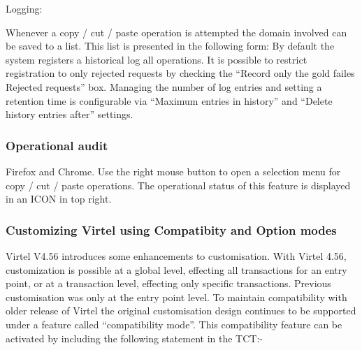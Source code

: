 \documentclass[letterpaper,10pt,english]{sphinxmanual}
\begin{document}
Logging:

Whenever a copy / cut / paste operation is attempted the domain involved can be saved to a list. This list is presented in the following form:
By default the system registers a historical log all operations. It is possible to restrict registration to only rejected
requests by checking the “Record only the gold failes Rejected requests” box. Managing the number of log entries
and setting a retention time is configurable via “Maximum entries in history” and “Delete history entries after”
settings.


\subsubsection{Operational audit}
\label{\detokenize{User_Guide:operational-audit}}
Firefox and Chrome. Use the right mouse button to open a selection menu for copy / cut / paste operations. The
operational status of this feature is displayed in an ICON in top right.








\subsubsection{Customizing Virtel using Compatibity and Option modes}
\label{\detokenize{User_Guide:customizing-virtel-using-compatibity-and-option-modes}}\label{\detokenize{User_Guide:v457ug-customizing-with-option}}
Virtel V4.56 introduces some enhancements to customisation. With Virtel 4.56, customization is possible at a global level, effecting all transactions for an entry point, or at a transaction level, effecting only specific transactions. Previous customisation was only at the entry point level. To maintain compatibility with older release of Virtel the original customisation design continues to be supported under a feature called “compatibility mode”. This compatibility feature can be activated by including the following statement in the TCT:-
\end{document}
